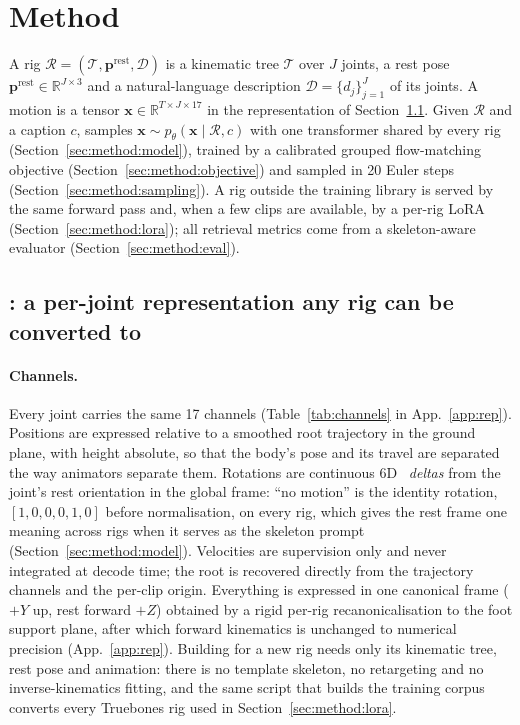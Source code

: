 \section{Method}\label{sec:method}

A rig $\mathcal{R}=(\mathcal{T},\mathbf{p}^{\mathrm{rest}},\mathcal{D})$ is a kinematic tree
$\mathcal{T}$ over $J$ joints, a rest pose $\mathbf{p}^{\mathrm{rest}}\in\mathbb{R}^{J\times3}$ and
a natural-language description $\mathcal{D}=\{d_j\}_{j=1}^{J}$ of its joints. A motion is a tensor
$\mathbf{x}\in\mathbb{R}^{T\times J\times 17}$ in the \rep{} representation of
Section~\ref{sec:method:rep}. Given $\mathcal{R}$ and a caption $c$, \method{} samples
$\mathbf{x}\sim p_\theta(\mathbf{x}\mid\mathcal{R},c)$ with one transformer shared by every rig
(Section~\ref{sec:method:model}), trained by a calibrated grouped flow-matching objective
(Section~\ref{sec:method:objective}) and sampled in 20 Euler steps
(Section~\ref{sec:method:sampling}). A rig outside the training library is served by the same
forward pass and, when a few clips are available, by a per-rig LoRA
(Section~\ref{sec:method:lora}); all retrieval metrics come from a skeleton-aware evaluator
(Section~\ref{sec:method:eval}).

\subsection{\rep{}: a per-joint representation any rig can be converted to}\label{sec:method:rep}

\paragraph{Channels.} Every joint carries the same 17 channels (Table~\ref{tab:channels} in App.~\ref{app:rep}). Positions
are expressed relative to a smoothed root trajectory in the ground plane, with height absolute, so
that the body's pose and its travel are separated the way animators separate them. Rotations are
continuous 6D~\citep{zhou2019continuity} \emph{deltas} from the joint's rest orientation in the global
frame: ``no motion'' is the identity rotation, $[1,0,0,0,1,0]$ before normalisation, on every rig,
which gives the rest frame one meaning across rigs when it serves as the skeleton prompt
(Section~\ref{sec:method:model}). Velocities are supervision only and
never integrated at decode time; the root is recovered directly from the trajectory channels and the
per-clip origin. Everything is expressed in one canonical frame ($+Y$ up, rest forward $+Z$) obtained
by a rigid per-rig recanonicalisation to the foot support plane, after which forward kinematics is
unchanged to numerical precision (App.~\ref{app:rep}). Building \rep{} for a new rig needs only its
kinematic tree, rest pose and animation: there is no template skeleton, no retargeting and no
inverse-kinematics fitting, and the same script that builds the training corpus converts every
Truebones rig used in Section~\ref{sec:method:lora}.


